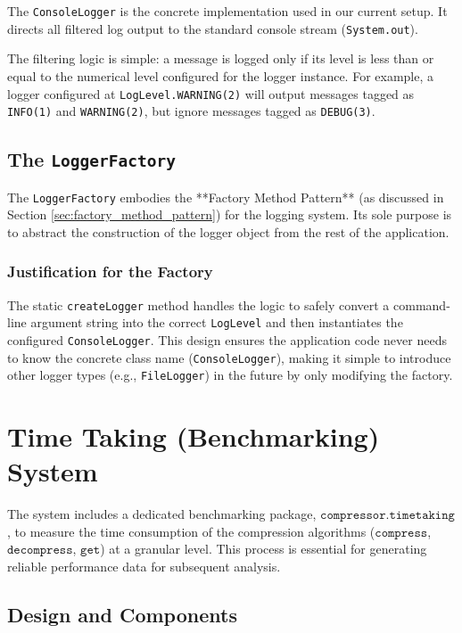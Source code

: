 \documentclass[11pt, a4paper]{article}
\begin{document}
	The \texttt{ConsoleLogger} is the concrete implementation used in our current setup. It directs all filtered log output to the standard console stream (\texttt{System.out}).
	
	The filtering logic is simple: a message is logged only if its level is less than or equal to the numerical level configured for the logger instance. For example, a logger configured at \texttt{LogLevel.WARNING(2)} will output messages tagged as \texttt{INFO(1)} and \texttt{WARNING(2)}, but ignore messages tagged as \texttt{DEBUG(3)}.
	
	\subsection{The \texttt{LoggerFactory}}
	\label{sec:logger_factory}
	
	The \texttt{LoggerFactory} embodies the **Factory Method Pattern** (as discussed in Section \ref{sec:factory_method_pattern}) for the logging system. Its sole purpose is to abstract the construction of the logger object from the rest of the application.
	
	
	\subsubsection*{Justification for the Factory}
	The static \texttt{createLogger} method handles the logic to safely convert a command-line argument string into the correct \texttt{LogLevel} and then instantiates the configured \texttt{ConsoleLogger}. This design ensures the application code never needs to know the concrete class name (\texttt{ConsoleLogger}), making it simple to introduce other logger types (e.g., \texttt{FileLogger}) in the future by only modifying the factory.
	
	
	\section{Time Taking (Benchmarking) System}
	\label{sec:timetaking_system}
	
	The system includes a dedicated benchmarking package, $\texttt{compressor.timetaking}$, to measure the time consumption of the compression algorithms ($\texttt{compress}$, $\texttt{decompress}$, $\texttt{get}$) at a granular level. This process is essential for generating reliable performance data for subsequent analysis.
	
	\subsection{Design and Components}
	\label{sec:timetaking_design}
	
\end{document}
